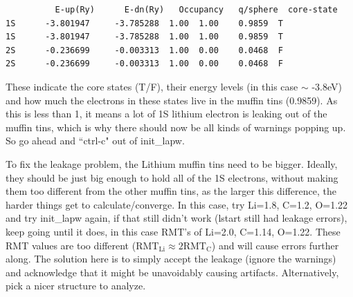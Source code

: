 \documentclass[12pt]{article}
\begin{document}
\begin{itemize}
	\begin{lstlisting}
          E-up(Ry)      E-dn(Ry)   Occupancy   q/sphere  core-state
1S      -3.801947     -3.785288  1.00  1.00    0.9859  T
1S      -3.801947     -3.785288  1.00  1.00    0.9859  T
2S      -0.236699     -0.003313  1.00  0.00    0.0468  F
2S      -0.236699     -0.003313  1.00  0.00    0.0468  F
	\end{lstlisting}
	
	These indicate the core states (T/F), their energy levels (in this case $\sim$ -3.8eV) and how much the electrons in these states live in the muffin tins (0.9859).  As this is less than 1, it means a lot of 1S lithium electron is leaking out of the muffin tins, which is why there should now be all kinds of warnings popping up.  So go ahead and ``ctrl-c" out of init\_lapw.
	
\end{itemize}  

To fix the leakage problem, the Lithium muffin tins need to be bigger.   Ideally, they should be just big enough to hold all of the 1S electrons, without making them too different from the other muffin tins, as the larger this difference, the harder things get to calculate/converge.  In this case, try Li=1.8,  C=1.2, O=1.22 and try init\_lapw again, if that still didn't work (lstart still had leakage errors), keep going until it does, in this case RMT's of Li=2.0,  C=1.14, O=1.22.  These RMT values are too different ($\mathrm{RMT_{Li}} \approx 2\mathrm{RMT_C}$) and will cause errors further along.  The solution here is to simply accept the leakage (ignore the warnings) and acknowledge that it might be unavoidably causing artifacts.  Alternatively, pick a nicer structure to analyze.  
\end{document}
